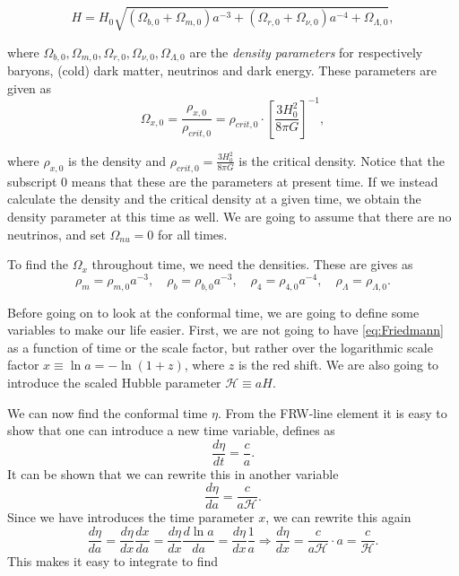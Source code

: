 \documentclass[a4paper,norsk, 10pt]{article}
\begin{document}
\begin{equation}\label{eq:Friedmann}
H = H_0 \sqrt{(\Omega_{b,0} + \Omega_{m,0})a^{-3} + (\Omega_{r,0} + \Omega_{\nu,0})a^{-4} + \Omega_{\Lambda,0}},
\end{equation}

where $\Omega_{b,0}, \Omega_{m,0}, \Omega_{r,0}, \Omega_{\nu,0}, \Omega_{\Lambda,0}$ are the \textit{density parameters} for respectively baryons, (cold) dark matter, neutrinos and dark energy. These parameters are given as
\begin{equation}\label{eq:Omega}
\Omega_{x,0} = \frac{\rho_{x,0}}{\rho_{crit,0}} = \rho_{crit,0}\cdot\left[\frac{3H_0^2}{8\pi G}\right]^{-1},
\end{equation}

where $\rho_{x,0}$ is the density and $\rho_{crit,0} = \frac{3H_0^2}{8\pi G}$ is the critical density. Notice that the subscript $0$ means that these are the parameters at present time. If we instead calculate the density and the critical density at a given time, we obtain the density parameter at this time as well. We are going to assume that there are no neutrinos, and set $\Omega_{nu} = 0$ for all times.

To find the $\Omega_{x}$ throughout time, we need the densities. These are gives as
\begin{equation}\label{eq:rho}
\rho_{m} = \rho_{m,0} a^{-3}, \quad \rho_{b} = \rho_{b,0} a^{-3}, \quad \rho_{4} = \rho_{4,0} a^{-4}, \quad \rho_{\Lambda} = \rho_{\Lambda,0}.
\end{equation}

Before going on to look at the conformal time, we are going to define some variables to make our life easier. First, we are not going to have \eqref{eq:Friedmann} as a function of time or the scale factor, but rather over the logarithmic scale factor $x \equiv \ln a = - \ln(1+z)$, where $z$ is the red shift. We are also going to introduce the scaled Hubble parameter $\mathcal{H} \equiv aH$.

We can now find the conformal time $\eta$. From the FRW-line element it is easy to show that one can introduce a new time variable, defines as
\begin{equation}
\frac{d\eta}{dt} = \frac{c}{a}.
\end{equation}
It can be shown that we can rewrite this in another variable
\begin{equation}
\frac{d \eta}{da} = \frac{c}{a\mathcal{H}}.
\end{equation}
Since we have introduces the time parameter $x$, we can rewrite this again
\begin{equation}\label{eq:deta/dx}
\frac{d\eta}{da} = \frac{d\eta}{dx}\frac{dx}{da} = \frac{d\eta}{dx}\frac{d \ln a}{da} = \frac{d\eta}{dx}\frac{1}{a} \Rightarrow \frac{d\eta}{dx} = \frac{c}{a\mathcal{H}}\cdot a = \frac{c}{\mathcal{H}}.
\end{equation}
This makes it easy to integrate to find 
\end{document}

